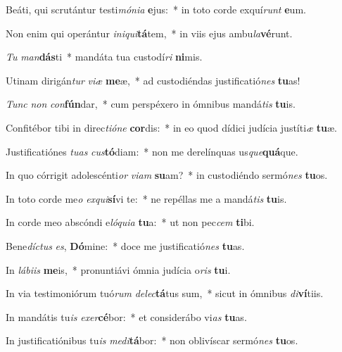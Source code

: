 \item Beáti, qui scrutántur testi\textit{mó}\textit{ni}\textit{a} \textbf{e}jus:~* in toto corde exquí\textit{runt} \textbf{e}um.
\item Non enim qui operántur \textit{in}\textit{i}\textit{qui}\textbf{tá}tem,~* in viis ejus ambu\textit{la}\textbf{vé}runt.
\item \textit{Tu} \textit{man}\textbf{dás}ti~* mandáta tua custodí\textit{ri} \textbf{ni}mis.
\item Utinam dirigán\textit{tur} \textit{vi}\textit{æ} \textbf{me}æ,~* ad custodiéndas justificatió\textit{nes} \textbf{tu}as!
\item \textit{Tunc} \textit{non} \textit{con}\textbf{fún}dar,~* cum perspéxero in ómnibus mandá\textit{tis} \textbf{tu}is.
\item Confitébor tibi in direc\textit{ti}\textit{ó}\textit{ne} \textbf{cor}dis:~* in eo quod dídici judícia justíti\textit{æ} \textbf{tu}æ.
\item Justificatiónes \textit{tu}\textit{as} \textit{cus}\textbf{tó}diam:~* non me derelínquas us\textit{que}\textbf{quá}que.
\item In quo córrigit adolescénti\textit{or} \textit{vi}\textit{am} \textbf{su}am?~* in custodiéndo sermó\textit{nes} \textbf{tu}os.
\item In toto corde me\textit{o} \textit{ex}\textit{qui}\textbf{sí}vi te:~* ne repéllas me a mandá\textit{tis} \textbf{tu}is.
\item In corde meo abscóndi e\textit{ló}\textit{qui}\textit{a} \textbf{tu}a:~* ut non pec\textit{cem} \textbf{ti}bi.
\item Bene\textit{díc}\textit{tus} \textit{es}, \textbf{Dó}mine:~* doce me justificatió\textit{nes} \textbf{tu}as.
\item In \textit{lá}\textit{bi}\textit{is} \textbf{me}is,~* pronuntiávi ómnia judícia o\textit{ris} \textbf{tu}i.
\item In via testimoniórum tuó\textit{rum} \textit{de}\textit{lec}\textbf{tá}tus sum,~* sicut in ómnibus \textit{di}\textbf{ví}tiis.
\item In mandátis tu\textit{is} \textit{ex}\textit{er}\textbf{cé}bor:~* et considerábo vi\textit{as} \textbf{tu}as.
\item In justificatiónibus tu\textit{is} \textit{me}\textit{di}\textbf{tá}bor:~* non oblivíscar sermó\textit{nes} \textbf{tu}os.

